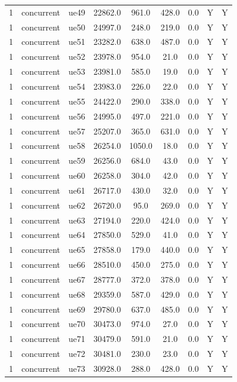 \begin{table}[ht]
\begin{tabular}{|c|c|c|c|c|c|c|c|c|}
1 & concurrent & ue49 & 22862.0 & 961.0 & 428.0 & 0.0 & Y & Y \\
1 & concurrent & ue50 & 24997.0 & 248.0 & 219.0 & 0.0 & Y & Y \\
1 & concurrent & ue51 & 23282.0 & 638.0 & 487.0 & 0.0 & Y & Y \\
1 & concurrent & ue52 & 23978.0 & 954.0 & 21.0 & 0.0 & Y & Y \\
1 & concurrent & ue53 & 23981.0 & 585.0 & 19.0 & 0.0 & Y & Y \\
1 & concurrent & ue54 & 23983.0 & 226.0 & 22.0 & 0.0 & Y & Y \\
1 & concurrent & ue55 & 24422.0 & 290.0 & 338.0 & 0.0 & Y & Y \\
1 & concurrent & ue56 & 24995.0 & 497.0 & 221.0 & 0.0 & Y & Y \\
1 & concurrent & ue57 & 25207.0 & 365.0 & 631.0 & 0.0 & Y & Y \\
1 & concurrent & ue58 & 26254.0 & 1050.0 & 18.0 & 0.0 & Y & Y \\
1 & concurrent & ue59 & 26256.0 & 684.0 & 43.0 & 0.0 & Y & Y \\
1 & concurrent & ue60 & 26258.0 & 304.0 & 42.0 & 0.0 & Y & Y \\
1 & concurrent & ue61 & 26717.0 & 430.0 & 32.0 & 0.0 & Y & Y \\
1 & concurrent & ue62 & 26720.0 & 95.0 & 269.0 & 0.0 & Y & Y \\
1 & concurrent & ue63 & 27194.0 & 220.0 & 424.0 & 0.0 & Y & Y \\
1 & concurrent & ue64 & 27850.0 & 529.0 & 41.0 & 0.0 & Y & Y \\
1 & concurrent & ue65 & 27858.0 & 179.0 & 440.0 & 0.0 & Y & Y \\
1 & concurrent & ue66 & 28510.0 & 450.0 & 275.0 & 0.0 & Y & Y \\
1 & concurrent & ue67 & 28777.0 & 372.0 & 378.0 & 0.0 & Y & Y \\
1 & concurrent & ue68 & 29359.0 & 587.0 & 429.0 & 0.0 & Y & Y \\
1 & concurrent & ue69 & 29780.0 & 637.0 & 485.0 & 0.0 & Y & Y \\
1 & concurrent & ue70 & 30473.0 & 974.0 & 27.0 & 0.0 & Y & Y \\
1 & concurrent & ue71 & 30479.0 & 591.0 & 21.0 & 0.0 & Y & Y \\
1 & concurrent & ue72 & 30481.0 & 230.0 & 23.0 & 0.0 & Y & Y \\
1 & concurrent & ue73 & 30928.0 & 288.0 & 428.0 & 0.0 & Y & Y \\

\end{tabular}
\end{table}

